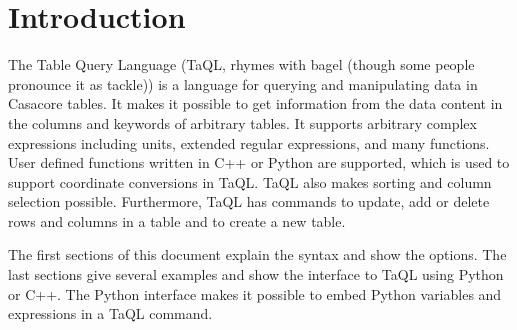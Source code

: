 

\section{Introduction}
The Table Query Language (TaQL, rhymes with bagel (though some people
pronounce it as tackle)) is a language for querying and manipulating
data in Casacore tables. It makes it possible to get information
from the data content in the
columns and keywords of arbitrary tables. It supports arbitrary complex
expressions including units, extended regular expressions, and many
functions. User defined functions written in C++ or Python are
supported, which is used to support coordinate conversions in TaQL.
TaQL also makes sorting and column selection possible.
Furthermore, TaQL has commands to update, add or delete rows and columns
in a table and to create a new table.

The first sections of this document explain the syntax and show the options.
The last sections give several examples and show the interface to TaQL
using Python or C++. 
The Python interface makes it possible to embed Python
variables and expressions in a TaQL command.

